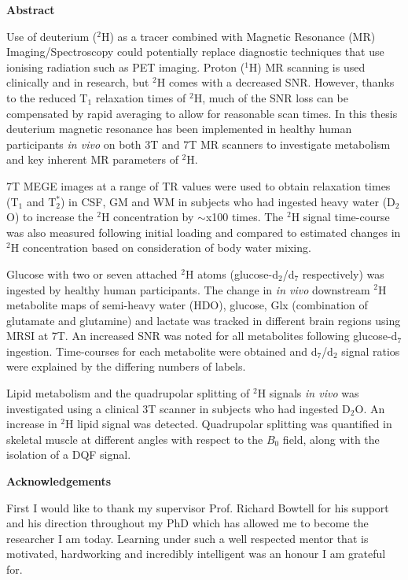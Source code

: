 \documentclass[12pt]{report}
\begin{document}
\newpage
\thispagestyle{plain}
\setcounter{page}{1}
\begin{center}
    \textbf{Abstract}
\end{center}
Use of deuterium ($^2$H) as a tracer combined with Magnetic Resonance (MR) Imaging/Spectroscopy could potentially replace diagnostic techniques that use ionising radiation such as \ac{PET} imaging. Proton ($^1$H) MR scanning is used clinically and in research, but $^2$H comes with a decreased \ac{SNR}. However, thanks to the reduced T$_1$ relaxation times of $^2$H, much of the \ac{SNR} loss can be compensated by rapid averaging to allow for reasonable scan times. In this thesis deuterium magnetic resonance has been implemented in healthy human participants \textit{in vivo} on both 3T and 7T MR scanners to investigate metabolism and key inherent MR parameters of $^2$H.

7T \ac{MEGE} images at a range of \ac{TR} values were used to obtain relaxation times (T$_1$ and T$_2^*$) in \ac{CSF}, \ac{GM} and \ac{WM} in subjects who had ingested heavy water (D$_2$O) to increase the $^2$H concentration by $\sim$x100 times. The $^2$H signal time-course was also measured following initial loading and compared to estimated changes in $^2$H concentration based on consideration of body water mixing.

Glucose with two or seven attached $^2$H atoms (glucose-d$_2$/d$_7$ respectively) was ingested by healthy human participants. The change in \textit{in vivo} downstream $^2$H metabolite maps of semi-heavy water (HDO), glucose, Glx (combination of glutamate and glutamine) and lactate was tracked in different brain regions using \ac{MRSI} at 7T. An increased \ac{SNR} was noted for all metabolites following glucose-d$_7$ ingestion. Time-courses for each metabolite were obtained and d$_7$/d$_2$ signal ratios were explained by the differing numbers of labels.

Lipid metabolism and the quadrupolar splitting of $^2$H signals \textit{in vivo} was investigated using a clinical 3T scanner in subjects who had ingested D$_2$O. An increase in $^2$H lipid signal was detected. Quadrupolar splitting was quantified in skeletal muscle at different angles with respect to the $B_0$ field, along with the isolation of a \ac{DQF} signal.

\newpage
\vspace*{\fill}

\newpage
\thispagestyle{plain}
\begin{center}
    \textbf{Acknowledgements}
\end{center}
First I would like to thank my supervisor Prof. Richard Bowtell for his support and his direction throughout my PhD which has allowed me to become the researcher I am today. Learning under such a well respected mentor that is motivated, hardworking and incredibly intelligent was an honour I am grateful for. 
\end{document}
